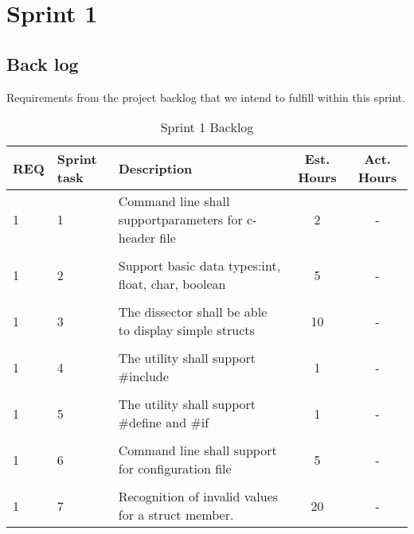 \chapter{Sprint 1}

\section{Back log}
Requirements from the project backlog that we intend to fulfill within this sprint.

\begin{table}[ht] \center
\caption{Sprint 1 Backlog}

\begin{tabular}{p{1cm} p{1cm} p{6cm} c  c}
	REQ &Sprint task & Description & Est. Hours & Act. Hours \\
	\hline
	1 &1 & Command line shall support\newline parameters for c-header file & 2 & -\\
	 & & &  & \\
	1 & 2 & Support basic data types:\newline int, float, char, boolean & 5 & -\\	
	 & & &  & \\
	1 &3 & The dissector shall be able to display simple structs & 10 & -\\
	 & & &  & \\
	1 & 4 & The utility shall support \#include & 1 & -\\
	 & & &  & \\
	1 & 5 & The utility shall support \#define and \#if & 1 & -\\	
	 & & &  & \\
	1 & 6 & Command line shall support for configuration file & 5 & -\\
	 & & &  & \\
	1 & 7 & Recognition of invalid values for a struct member. & 20 & -\\
\end{tabular}
\end{table}

